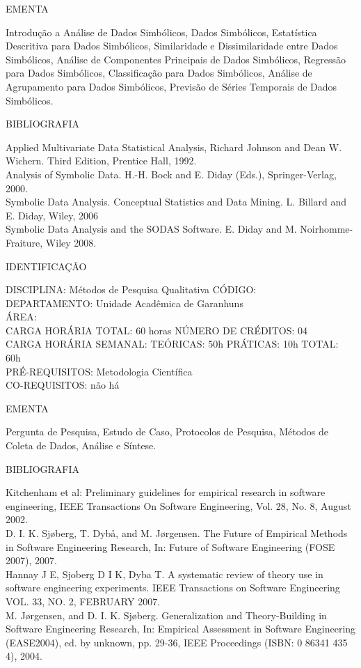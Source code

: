 \documentclass[
	12pt,				%
	openright,			%
  oneside,     %
	a4paper,			%
	english,			%
	french,				%
	spanish,			%
	brazil				%
	]{abntex2}
\begin{document}
\begin{apendicesenv}
EMENTA 

Introdução a Análise de Dados Simbólicos, Dados Simbólicos, Estatística
Descritiva para Dados Simbólicos, Similaridade e Dissimilaridade entre
Dados Simbólicos, Análise de Componentes Principais de Dados
Simbólicos, Regressão para Dados Simbólicos, Classificação para Dados
Simbólicos, Análise de Agrupamento para Dados Simbólicos, Previsão de
Séries Temporais de Dados Simbólicos.

BIBLIOGRAFIA 

Applied Multivariate Data Statistical Analysis, Richard Johnson and Dean
W. Wichern. Third Edition, Prentice Hall, 1992.\\
Analysis of Symbolic Data. H.-H. Bock and E. Diday (Eds.),
Springer-Verlag, 2000.\\
Symbolic Data Analysis. Conceptual Statistics and Data Mining. L.
Billard and E. Diday, Wiley, 2006\\
Symbolic Data Analysis and the SODAS Software. E. Diday and M.
Noirhomme-Fraiture, Wiley 2008.

\newpage IDENTIFICAÇÃO

DISCIPLINA: Métodos de Pesquisa Qualitativa CÓDIGO: \\
DEPARTAMENTO: Unidade Acadêmica de Garanhuns\\
ÁREA: \\
CARGA HORÁRIA TOTAL: 60 horas NÚMERO DE CRÉDITOS: 04\\
CARGA HORÁRIA SEMANAL: TEÓRICAS: 50h PRÁTICAS: 10h TOTAL: 60h\\
PRÉ-REQUISITOS: Metodologia Científica\\
CO-REQUISITOS: não há

EMENTA 

Pergunta de Pesquisa, Estudo de Caso, Protocolos de Pesquisa, Métodos de
Coleta de Dados, Análise e Síntese.

BIBLIOGRAFIA 

Kitchenham et al: Preliminary guidelines for empirical research in
software engineering, IEEE Transactions On Software Engineering, Vol.
28, No. 8, August 2002.\\
D. I. K. Sjøberg, T. Dybå, and M. Jørgensen. The Future of Empirical
Methods in Software Engineering Research, In: Future of Software
Engineering (FOSE 2007), 2007.\\
Hannay J E, Sjoberg D I K, Dyba T. A systematic review of theory use in
software engineering experiments. IEEE Transactions on Software
Engineering VOL. 33, NO. 2, FEBRUARY 2007.\\
M. Jørgensen, and D. I. K. Sjøberg. Generalization and Theory-Building
in Software Engineering Research, In: Empirical Assessment in Software
Engineering (EASE2004), ed. by unknown, pp. 29-36, IEEE Proceedings
(ISBN: 0 86341 435 4), 2004.


\end{apendicesenv}
\end{document}
